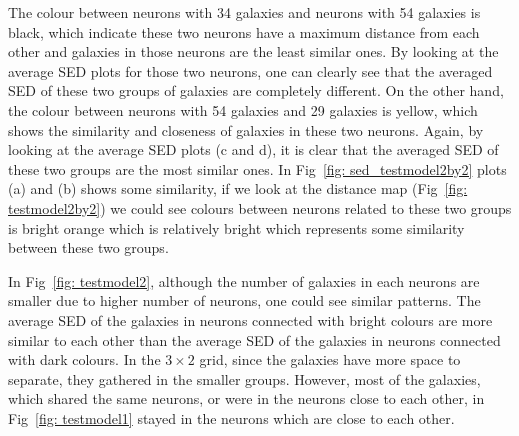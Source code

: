     The colour between neurons with 34 galaxies and neurons with 54 galaxies is black, which indicate these two neurons have a maximum distance from each other and galaxies in those neurons are the least similar ones. By looking at the average SED plots for those two neurons, one can clearly see that the averaged SED of these two groups of galaxies are completely different. %
    On the other hand, the colour between neurons with 54 galaxies and 29 galaxies is yellow, which shows the similarity and closeness of galaxies in these two neurons. 
    Again, by looking at the average SED plots (c and d), it is clear that the averaged SED of these two groups are the most similar ones. 
    In Fig~\ref{fig: sed_testmodel2by2} plots (a) and (b) shows some similarity, if we look at the distance map (Fig~\ref{fig: testmodel2by2}) we could see colours between neurons related to these two groups is bright orange which is relatively bright which represents some similarity between these two groups.
    
    In Fig~\ref{fig: testmodel2}, although the number of galaxies in each neurons are smaller due to higher number of neurons, one could see similar patterns. 
    The average SED of the galaxies in neurons connected with bright colours are more similar to each other than the average SED of the galaxies in neurons connected with dark colours.
    In the $3\times2$ grid, since the galaxies have more space to separate, they gathered in the smaller groups. 
    However, most of the galaxies, which shared the same neurons, or were in the neurons close to each other, in Fig~\ref{fig: testmodel1} stayed in the neurons which are close to each other.
    
